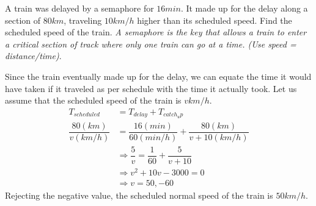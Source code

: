 
%
%
%
%
% 
% 

\question A train was delayed by a semaphore for $16min$. It made up for the delay along a section of $80km$, traveling $10km/h$ higher than its scheduled speed. Find the scheduled speed of the train. \textit{A semaphore is the key that allows a train to enter a critical section of track where only one train can go at a time. (Use speed = distance/time)}.

\insertQR{}

\ifprintanswers
\fi 

\begin{solution}
  Since the train eventually made up for the delay, we can equate the time it would have taken if it traveled as per schedule with the time it actually took. Let us assume that the scheduled speed of the train is $vkm/h$.
  \begin{align}
    T_{scheduled}           &= T_{delay} + T_{catch_up} \\
    \dfrac{80(km)}{v(km/h)} &= \dfrac{16(min)}{60(min/h)}+\dfrac{80(km)}{v+10(km/h)} \\
    &\Rightarrow \dfrac{5}{v} = \dfrac{1}{60}+\dfrac{5}{v+10} \\
    &\Rightarrow v^2+10v-3000 = 0 \\
    &\Rightarrow v            = 50,-60
  \end{align}
  Rejecting the negative value, the scheduled normal speed of the train is $50km/h$.
\end{solution}


